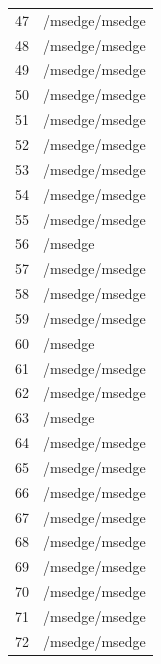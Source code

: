\documentclass[a4paper,twoside,12pt]{book}
\begin{document}
\begin{appendices}
\begin{table}
\begin{tabular}{ll}
		47  &                                     /msedge/msedge \\
		48  &                                     /msedge/msedge \\
		49  &                                     /msedge/msedge \\
		50  &                                     /msedge/msedge \\
		51  &                                     /msedge/msedge \\
		52  &                                     /msedge/msedge \\
		53  &                                     /msedge/msedge \\
		54  &                                     /msedge/msedge \\
		55  &                                     /msedge/msedge \\
		56  &                                            /msedge \\
		57  &                                     /msedge/msedge \\
		58  &                                     /msedge/msedge \\
		59  &                                     /msedge/msedge \\
		60  &                                            /msedge \\
		61  &                                     /msedge/msedge \\
		62  &                                     /msedge/msedge \\
		63  &                                            /msedge \\
		64  &                                     /msedge/msedge \\
		65  &                                     /msedge/msedge \\
		66  &                                     /msedge/msedge \\
		67  &                                     /msedge/msedge \\
		68  &                                     /msedge/msedge \\
		69  &                                     /msedge/msedge \\
		70  &                                     /msedge/msedge \\
		71  &                                     /msedge/msedge \\
		72  &                                     /msedge/msedge \\

\end{tabular}
\end{table}
\end{appendices}
\end{document}
